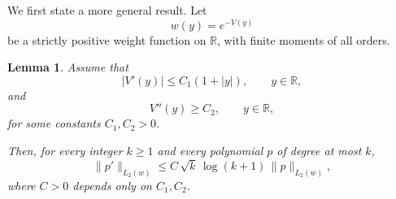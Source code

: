 \documentclass[letterpaper,11pt]{article}
\newtheorem{lemma}[theorem]{Lemma}
\theoremstyle{definition}
\begin{document}
We first state a more general result.     Let
    \[
      w(y)=e^{-V(y)}
    \]
    be a strictly positive weight function on $\mathbb R$, with finite moments of all orders.


    \begin{lemma}\label{lem:diff-op-bound}
      Assume that
      \begin{equation}\label{eq:Vp-linear-bound}
        |V'(y)|\le C_1(1+|y|),\qquad y\in\mathbb R,
      \end{equation}
      and
      \begin{equation}\label{eq:Vpp-lower-bound}
        V''(y)\ge C_2,\qquad y\in\mathbb R,
      \end{equation}
      for some constants $C_1,C_2>0$.

      Then, for every integer $k\ge 1$ and every polynomial $p$ of degree at most $k$,
      \[
        \|p'\|_{L_2(w)}
        \le
        C\,\sqrt{k}\,\log (k+1)\,\|p\|_{L_2(w)},
      \]
      where $C>0$ depends only on $C_1,C_2$.
    \end{lemma}
\end{document}
